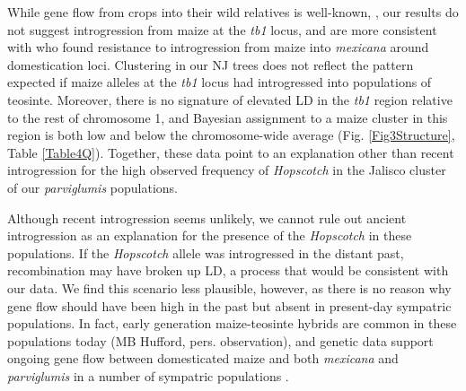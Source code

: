 \documentclass[11pt]{article} %
\begin{document}
\begin{linenumbers}
\begin{flushleft}
While gene flow from crops into their wild relatives is well-known, \citep{Ellstrand1999, Zhang2009, Thurber2010, Baack2008, Hubner2012, Wilkes1977, VanHeerwaarden2011, Barrett1983}, our results do not suggest introgression from maize at the \emph{tb1} locus, and are more consistent with \citet{Hufford2013} who found resistance to introgression from maize into \emph{mexicana} around domestication loci. 
Clustering in our NJ trees does not reflect the pattern expected if maize alleles at the \emph{tb1} locus had introgressed into populations of teosinte.  Moreover, there is no signature of elevated LD in the \emph{tb1} region relative to the rest of chromosome 1, and Bayesian assignment to a maize cluster in this region is both low and below the chromosome-wide average (Fig. \ref{Fig3Structure}, Table \ref{Table4Q}). Together, these data point to an explanation other than recent introgression for the high observed frequency of \emph{Hopscotch} in the Jalisco cluster of our \emph{parviglumis} populations.

Although recent introgression seems unlikely, we cannot rule out ancient introgression as an explanation for the presence of the \emph{Hopscotch} in these populations. If the \emph{Hopscotch} allele was introgressed in the distant past, recombination may have broken up LD, a process that would be consistent with our data.  We find this scenario less plausible, however, as there is no reason why gene flow should have been high in the past but absent in present-day sympatric populations.  In fact, early generation maize-teosinte hybrids are common in these populations today (MB Hufford, pers. observation), and genetic data support ongoing gene flow between domesticated maize and both \emph{mexicana} and \emph{parviglumis} in a number of sympatric populations \citep{Hufford2013, Ellstrand2007, VanHeerwaarden2011, Warburton2011}. 


\end{flushleft}
\end{linenumbers}
\end{document}
